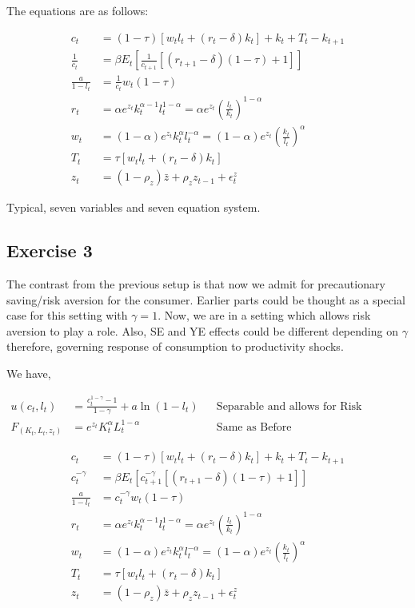 \documentclass[12pt]{article}
\begin{document}
\vskip 3cm
The equations are as follows:

\begin{align}
c_t &= (1 - \tau)[w_tl_t + (r_t -\delta)k_t] + k_t + T_t - k_{t+1} \\
\frac{1}{c_t} &= \beta E_t\left[\frac{1}{c_{t+1}}[(r_{t+1} - \delta)(1 - \tau) + 1]\right] \\
\frac{a}{1-l_t} &= \frac{1}{c_t} w_t (1-\tau) \\
r_t &= \alpha e^{z_t} k_t^{\alpha -1} l_t^{1-\alpha} =  \alpha e^{z_t}  \left(\frac{l_t}{k_t} \right)^{1 - \alpha} \\
w_t &= (1 - \alpha) e^{z_t} k_t^{\alpha} l_t ^{-\alpha} = (1 - \alpha) e^{z_t} \left(\frac{k_t}{l_t} \right)^{\alpha} \\	
T_t &= \tau[w_tl_t + (r_t - \delta)k_t] \\
z_t &= (1-\rho_z)\bar{z} + \rho_z z_{t-1} + \epsilon^z_t 
\end{align}

Typical, seven variables and seven equation system.

\subsection*{Exercise 3}

The contrast from the previous setup is that now we admit for precautionary saving/risk aversion for the consumer. Earlier parts could be thought as a special case for this setting with $\gamma=1$. Now, we are in a setting which allows risk aversion to play a role. Also, SE and YE effects could be different depending on $\gamma$ therefore, governing response of consumption to productivity shocks. 

We have,

\begin{align}
u(c_t, l_t) &= \frac{c_t^{1-\gamma}-1}{1 - \gamma} + a \ln(1 - l_t) && \text{Separable and allows for Risk aversion } \\
F_(K_t, L_t, z_t) &= e^{z_t} K_t^{\alpha}L_t^{1-\alpha} && \text{Same as Before }
\end{align}


\begin{align}
c_t &= (1 - \tau)[w_tl_t + (r_t -\delta)k_t] + k_t + T_t - k_{t+1} \\
c_t ^{-\gamma} &= \beta E_t\left[ c_{t+1}^{-\gamma} [(r_{t+1} - \delta)(1 - \tau) + 1]\right] \\
\frac{a}{1-l_t} &= c_t ^{-\gamma} w_t (1-\tau) \\
r_t &= \alpha e^{z_t} k_t^{\alpha -1} l_t^{1-\alpha} =  \alpha e^{z_t}  \left(\frac{l_t}{k_t} \right)^{1 - \alpha} \\
w_t &= (1 - \alpha) e^{z_t} k_t^{\alpha} l_t ^{-\alpha} = (1 - \alpha) e^{z_t} \left(\frac{k_t}{l_t} \right)^{\alpha} \\	
T_t &= \tau[w_tl_t + (r_t - \delta)k_t] \\
z_t &= (1-\rho_z)\bar{z} + \rho_z z_{t-1} + \epsilon^z_t
\end{align}
\end{document}
